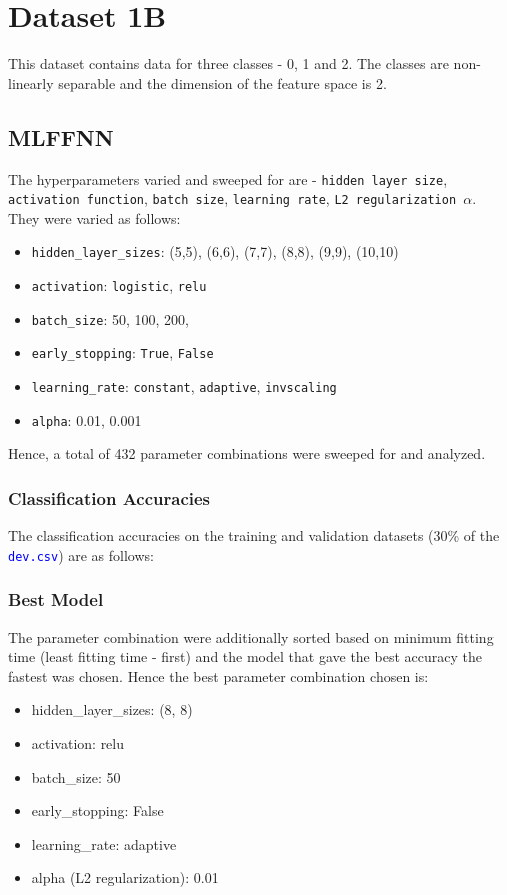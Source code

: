 \documentclass[11pt,a4paper]{article}
\newcommand{\noi}{\noindent}
\def\tt#1{\texttt{#1}}
\def\colortt#1{\textcolor{blue}{\texttt{#1}}}
\begin{document}
\break
\section{Dataset 1B}
This dataset contains data for three classes - 0, 1 and 2. The classes are non-linearly separable and the dimension of the feature space is 2.
\subsection{MLFFNN}
The hyperparameters varied and sweeped for are - \tt{hidden layer size}, \tt{activation function}, \tt{batch size}, \tt{learning rate}, \tt{L2 regularization $\alpha$}. They were varied as follows:
\begin{itemize}
    \itemsep0em
    \item \tt{hidden\_layer\_sizes}: (5,5), (6,6), (7,7), (8,8), (9,9), (10,10)
    \item \tt{activation}: \tt{logistic}, \tt{relu}
    \item \tt{batch\_size}: 50, 100, 200, 
    \item \tt{early\_stopping}: \tt{True}, \tt{False}
    \item \tt{learning\_rate}: \tt{constant}, \tt{adaptive}, \tt{invscaling}
    \item \tt{alpha}: 0.01, 0.001
\end{itemize}

\noi
Hence, a total of 432 parameter combinations were sweeped for and analyzed.

\subsubsection{Classification Accuracies}
The classification accuracies on the training and validation datasets (30\% of the \colortt{dev.csv}) are as follows:


\subsubsection{Best Model}
The parameter combination were additionally sorted based on minimum fitting time (least fitting time - first) and the model that gave the best accuracy the fastest was chosen. Hence the best parameter combination chosen is:
\begin{itemize}
    \itemsep0em
    \item hidden\_layer\_sizes: (8, 8)
    \item activation: relu
    \item batch\_size: 50
    \item early\_stopping: False
    \item learning\_rate: adaptive
    \item alpha (L2 regularization): 0.01
\end{itemize}
\end{document}
